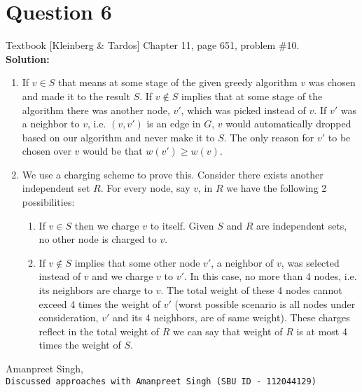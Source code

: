 \documentclass[11pt]{article}
\begin{document}
\section{Question 6} Textbook [Kleinberg \& Tardos] Chapter 11, page 651, problem \#10. \\
\textbf{Solution:}

\begin{enumerate}[a]

\item If $ v \in S $ that means at some stage of the given greedy algorithm $ v $ was chosen and made it to the result $ S $. If $ v \notin S $ implies that at some stage of the algorithm there was another node, $ v' $, which was picked instead of $ v $. If $ v' $ was a neighbor to $ v $, i.e. $ (v, v') $ is an edge in $ G $, $ v $ would automatically dropped based on our algorithm and never make it to $ S $. The only reason for $ v' $ to be chosen over $ v $ would be that $ w(v') \ge w(v) $.

\item We use a charging scheme to prove this. Consider there exists another independent set $ R $. For every node, say $ v $, in $ R $ we have the following 2 possibilities:

\begin{enumerate}
	\item If $ v \in S $ then we charge $ v $ to itself. Given $ S $ and $ R $ are independent sets, no other node is charged to $ v $.
	
	\item If $ v \notin S $ implies that some other node $ v' $, a neighbor of $ v $, was selected instead of $ v $ and we charge $ v $ to $ v' $. In this case, no more than 4 nodes, i.e. its neighbors are charge to $ v $. The total weight of these 4 nodes cannot exceed 4 times the weight of $ v' $ (worst possible scenario is all nodes under consideration, $ v' $ and its 4 neighbors, are of same weight). These charges reflect in the total weight of $ R $ we can say that weight of $ R $ is at most 4 times the weight of $ S $.
\end{enumerate}

\end{enumerate}


\begin{thebibliography}{9}
	Amanpreet Singh,
	\\\texttt{Discussed approaches with Amanpreet Singh (SBU ID - 112044129)}
\end{thebibliography}
\end{document}
